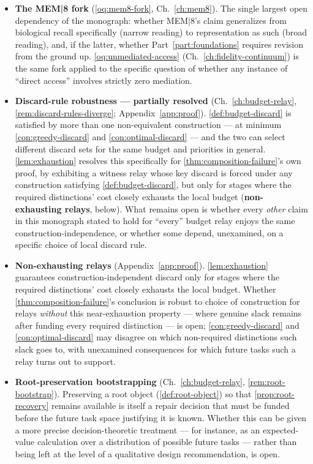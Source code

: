 \begin{itemize}
  \item \textbf{The MEM|8 fork} (\cref{oq:mem8-fork}, Ch.~\ref{ch:mem8}).
  The single largest open dependency of the monograph: whether MEM|8's
  claim generalizes from biological recall specifically (narrow reading)
  to representation as such (broad reading), and, if the latter, whether
  Part~\ref{part:foundations} requires revision from the ground up.
  \cref{oq:unmediated-access} (Ch.~\ref{ch:fidelity-continuum}) is the
  same fork applied to the specific question of whether any instance of
  ``direct access'' involves strictly zero mediation.

  \item \textbf{Discard-rule robustness --- partially resolved}
  (Ch.~\ref{ch:budget-relay}, \cref{rem:discard-rules-diverge};
  Appendix~\ref{app:proof}). \cref{def:budget-discard} is satisfied by
  more than one non-equivalent construction --- at minimum
  \cref{con:greedy-discard} and \cref{con:optimal-discard} --- and the
  two can select different discard sets for the same budget and
  priorities in general. \cref{lem:exhaustion} resolves this specifically
  for \cref{thm:composition-failure}'s own proof, by exhibiting a witness
  relay whose key discard is forced under any construction satisfying
  \cref{def:budget-discard}, but only for stages where the required
  distinctions' cost closely exhausts the local budget
  (\textbf{non-exhausting relays}, below). What remains open is whether
  every \emph{other} claim in this monograph stated to hold for ``every''
  budget relay enjoys the same construction-independence, or whether some
  depend, unexamined, on a specific choice of local discard rule.

  \item \textbf{Non-exhausting relays} (Appendix~\ref{app:proof}).
  \cref{lem:exhaustion} guarantees construction-independent discard only
  for stages where the required distinctions' cost closely exhausts the
  local budget. Whether \cref{thm:composition-failure}'s conclusion is
  robust to choice of construction for relays \emph{without} this
  near-exhaustion property --- where genuine slack remains after funding
  every required distinction --- is open; \cref{con:greedy-discard} and
  \cref{con:optimal-discard} may disagree on which non-required
  distinctions such slack goes to, with unexamined consequences for which
  future tasks such a relay turns out to support.

  \item \textbf{Root-preservation bootstrapping} (Ch.~\ref{ch:budget-relay},
  \cref{rem:root-bootstrap}). Preserving a root object
  (\cref{def:root-object}) so that \cref{prop:root-recovery} remains
  available is itself a repair decision that must be funded before the
  future task space justifying it is known. Whether this can be given a
  more precise decision-theoretic treatment --- for instance, as an
  expected-value calculation over a distribution of possible future tasks
  --- rather than being left at the level of a qualitative design
  recommendation, is open.


\end{itemize}
